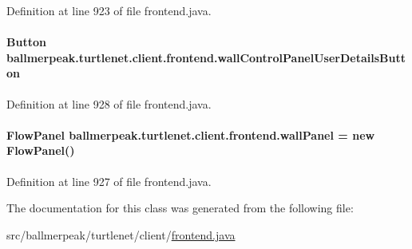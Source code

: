 Definition at line 923 of file frontend.\-java.

\hypertarget{classballmerpeak_1_1turtlenet_1_1client_1_1frontend_ae8e9ee35fb5626cbcdffeb1217d9b71e}{
\paragraph[{wall\-Control\-Panel\-User\-Details\-Button}]{\setlength{\rightskip}{0pt plus 5cm}Button ballmerpeak.\-turtlenet.\-client.\-frontend.\-wall\-Control\-Panel\-User\-Details\-Button\hspace{0.3cm}{\ttfamily [private]}}}\label{classballmerpeak_1_1turtlenet_1_1client_1_1frontend_ae8e9ee35fb5626cbcdffeb1217d9b71e}


Definition at line 928 of file frontend.\-java.

\hypertarget{classballmerpeak_1_1turtlenet_1_1client_1_1frontend_aabfe3b109c5a81d51ede885f008d7530}{
\paragraph[{wall\-Panel}]{\setlength{\rightskip}{0pt plus 5cm}Flow\-Panel ballmerpeak.\-turtlenet.\-client.\-frontend.\-wall\-Panel = new Flow\-Panel()\hspace{0.3cm}{\ttfamily [private]}}}\label{classballmerpeak_1_1turtlenet_1_1client_1_1frontend_aabfe3b109c5a81d51ede885f008d7530}


Definition at line 927 of file frontend.\-java.



The documentation for this class was generated from the following file\-:\begin{DoxyCompactItemize}
\item 
src/ballmerpeak/turtlenet/client/\hyperlink{frontend_8java}{frontend.\-java}\end{DoxyCompactItemize}

